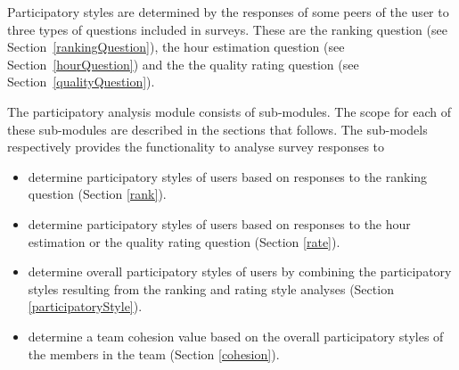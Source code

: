 Participatory styles are determined by the responses of some peers of the user to three types of questions included in surveys. These are the ranking question (see Section~\ref{rankingQuestion}), the hour estimation question  (see Section~\ref{hourQuestion}) and the the quality rating question  (see Section~\ref{qualityQuestion}). 

The participatory analysis module consists of sub-modules. The scope for each of these sub-modules are described in the sections that follows.  The sub-models respectively provides the functionality to analyse survey responses to
\begin{itemize}
\item determine participatory styles of users based on responses to the ranking question (Section \ref{rank}).
\item determine participatory styles of users based on responses to the hour estimation or the quality rating question (Section \ref{rate}).
\item determine overall participatory styles of users by combining the participatory styles resulting from the ranking and rating style analyses (Section \ref{participatoryStyle}).
\item determine a team cohesion value based on the overall participatory styles of the members in the team (Section \ref{cohesion}).
\end{itemize} 